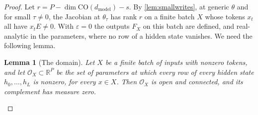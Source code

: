 \documentclass[10pt]{article}
\newtheorem{lemma}[theorem]{Lemma}
\theoremstyle{definition}
\theoremstyle{remark}
\newcommand{\R}{\mathbb{R}}
\newcommand{\dm}{d_{\mathrm{model}}}
\newcommand{\CO}{\mathrm{CO}}
\newenvironment{nested}{\par\nopagebreak\def\FrameCommand{\hspace{0.5em}{\color{black!30}\vrule width 0.6pt}\hspace{1em}}\MakeFramed{\advance\hsize-\width\FrameRestore}}{\endMakeFramed}
\begin{document}
\begin{proof}
Let $r = P - \dim\CO(\dm) - s$. By \cref{lem:smallwrites}, at generic $\theta$ and for small $\tau \neq 0$, the Jacobian at $\theta_\tau$ has rank $r$ on a finite batch $X$ whose tokens $x_t$ all have $x_tE \neq 0$. With $\varepsilon = 0$ the outputs $F_X$ on this batch are defined, and real-analytic in the parameters, where no row of a hidden state vanishes. We need the following lemma.
\begin{nested}
\begin{lemma}[The domain]\label{lem:domain}
Let $X$ be a finite batch of inputs with nonzero tokens, and let $\mathcal O_X \subset \R^P$ be the set of parameters at which every row of every hidden state $h_0, \dots, h_L$ is nonzero, for every $x \in X$. Then $\mathcal O_X$ is open and connected, and its complement has measure zero.
\end{lemma}


\end{nested}
\end{proof}
\end{document}
